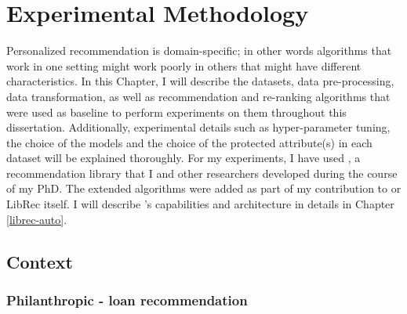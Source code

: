 \chapter{Experimental Methodology}
\label{ch:methodology}

Personalized recommendation is domain-specific; in other words algorithms that work in one setting might work poorly in others that might have different characteristics. \todo{\cite{}}
In this Chapter, I will describe the datasets, data pre-processing, data transformation, as well as recommendation and re-ranking algorithms that were used as baseline to perform experiments on them throughout this dissertation. 
Additionally, experimental details such as hyper-parameter tuning, the choice of the models and the choice of the protected attribute(s) in each dataset will be explained thoroughly. For my experiments, I have used \libauto{}, a recommendation library that I and other researchers developed during the course of my PhD. The extended algorithms were added as part of my contribution to \libauto{} or LibRec itself. I will describe \libauto{}'s capabilities and architecture in details in Chapter \ref{librec-auto}.


\section{Context}
    \subsection{Philanthropic - loan recommendation}

    
